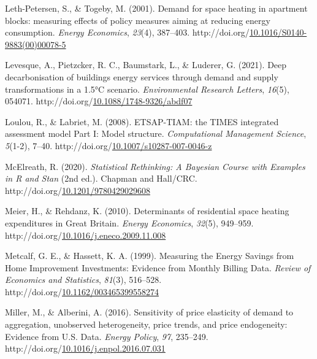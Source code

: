 \documentclass[12pt,twoside]{reedthesis}
\newlength{\cslhangindent}
\newenvironment{CSLReferences}[2] %
 {%
  \setlength{\parindent}{0pt}
  \ifodd #1 \everypar{\setlength{\hangindent}{\cslhangindent}}\ignorespaces\fi
  \ifnum #2 > 0
  \setlength{\parskip}{#2\baselineskip}
  \fi
 }%
 {}
\begin{document}
\begin{CSLReferences}{1}{0}
\leavevmode{}%
Leth-Petersen, S., \& Togeby, M. (2001). Demand for space heating in apartment blocks: measuring effects of policy measures aiming at reducing energy consumption. \emph{Energy Economics}, \emph{23}(4), 387--403. http://doi.org/\href{https://doi.org/10.1016/S0140-9883(00)00078-5}{10.1016/S0140-9883(00)00078-5}

\leavevmode{}%
Levesque, A., Pietzcker, R. C., Baumstark, L., \& Luderer, G. (2021). Deep decarbonisation of buildings energy services through demand and supply transformations in a 1.5°C scenario. \emph{Environmental Research Letters}, \emph{16}(5), 054071. http://doi.org/\href{https://doi.org/10.1088/1748-9326/abdf07}{10.1088/1748-9326/abdf07}

\leavevmode{}%
Loulou, R., \& Labriet, M. (2008). ETSAP-TIAM: the TIMES integrated assessment model Part I: Model structure. \emph{Computational Management Science}, \emph{5}(1-2), 7--40. http://doi.org/\href{https://doi.org/10.1007/s10287-007-0046-z}{10.1007/s10287-007-0046-z}

\leavevmode{}%
McElreath, R. (2020). \emph{Statistical Rethinking: A Bayesian Course with Examples in R and Stan} (2nd ed.). Chapman and Hall/CRC. http://doi.org/\href{https://doi.org/10.1201/9780429029608}{10.1201/9780429029608}

\leavevmode{}%
Meier, H., \& Rehdanz, K. (2010). Determinants of residential space heating expenditures in Great Britain. \emph{Energy Economics}, \emph{32}(5), 949--959. http://doi.org/\href{https://doi.org/10.1016/j.eneco.2009.11.008}{10.1016/j.eneco.2009.11.008}

\leavevmode{}%
Metcalf, G. E., \& Hassett, K. A. (1999). Measuring the Energy Savings from Home Improvement Investments: Evidence from Monthly Billing Data. \emph{Review of Economics and Statistics}, \emph{81}(3), 516--528. http://doi.org/\href{https://doi.org/10.1162/003465399558274}{10.1162/003465399558274}

\leavevmode{}%
Miller, M., \& Alberini, A. (2016). Sensitivity of price elasticity of demand to aggregation, unobserved heterogeneity, price trends, and price endogeneity: Evidence from U.S. Data. \emph{Energy Policy}, \emph{97}, 235--249. http://doi.org/\href{https://doi.org/10.1016/j.enpol.2016.07.031}{10.1016/j.enpol.2016.07.031}


\end{CSLReferences}
\end{document}
